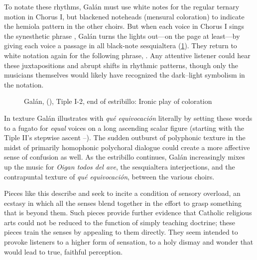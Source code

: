 To notate these rhythms, Galán must use white notes for the regular ternary
motion in Chorus I, but blackened noteheads (mensural coloration) to indicate
the hemiola pattern in the other choirs.
But when each voice in Chorus I sings the synesthetic phrase , Galán turns the lights out---on the page at least---by
giving each voice a passage in all black-note sesquialtera
(\cref{fig:Galan-Oigan-coloratio}).
They return to white notation again for the following phrase, .
Any attentive listener could hear these juxtapositions and abrupt shifts in
rhythmic patterns, though only the musicians themselves would likely have
recognized the dark--light symbolism in the notation.%
    \Autocite[36]{Kendrick:Jeremiah}

\begin{figure}
    \caption{Galán,  (),
    Tiple I-2, end of estribillo: Ironic play of coloration}

    \label{fig:Galan-Oigan-coloratio}

\end{figure}

In texture Galán illustrates with \emph{qué equivocación} literally by setting
these words to a fugato for \emph{equal} voices on a long ascending scalar
figure (starting with the Tiple II's stepwise ascent
--).
The sudden outburst of polyphonic texture in the midst of primarily homophonic
polychoral dialogue could create a more affective sense of confusion as well.
As the estribillo continues, Galán increasingly mixes up the music for
\emph{Oigan todos del ave}, the sesquialtera interjections, and the contrapuntal
texture of \emph{qué equivocación}, between the various choirs.

Pieces like this describe and seek to incite a condition of sensory overload, an
ecstasy in which all the senses blend together in the effort to grasp something
that is beyond them.
Such pieces provide further evidence that Catholic religious arts could not be
reduced to the function of simply teaching doctrine; these pieces train the
senses by appealing to them directly.
They seem intended to provoke listeners to a higher form of sensation, to a holy
dismay and wonder that would lead to true, faithful perception.

